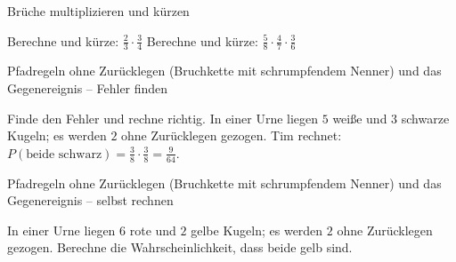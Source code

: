 \begin{aufgabe}{Brüche multiplizieren und kürzen}
\begin{teile}
\teil Berechne und kürze: $\frac{2}{3} \cdot \frac{3}{4}$
\teil Berechne und kürze: $\frac{5}{8} \cdot \frac{4}{7} \cdot \frac{3}{6}$
\end{teile}
\end{aufgabe}

\begin{aufgabe}{Pfadregeln ohne Zurücklegen (Bruchkette mit schrumpfendem Nenner) und das Gegenereignis – Fehler finden}
\begin{teile}
\teil Finde den Fehler und rechne richtig. In einer Urne liegen $5$ weiße und $3$ schwarze Kugeln; es werden $2$ ohne Zurücklegen gezogen. Tim rechnet: $P(\text{beide schwarz}) = \frac{3}{8} \cdot \frac{3}{8} = \frac{9}{64}$.
\end{teile}
\end{aufgabe}

\begin{aufgabe}{Pfadregeln ohne Zurücklegen (Bruchkette mit schrumpfendem Nenner) und das Gegenereignis – selbst rechnen}
\begin{teile}
\teil In einer Urne liegen $6$ rote und $2$ gelbe Kugeln; es werden $2$ ohne Zurücklegen gezogen. Berechne die Wahrscheinlichkeit, dass beide gelb sind.
\end{teile}
\end{aufgabe}
